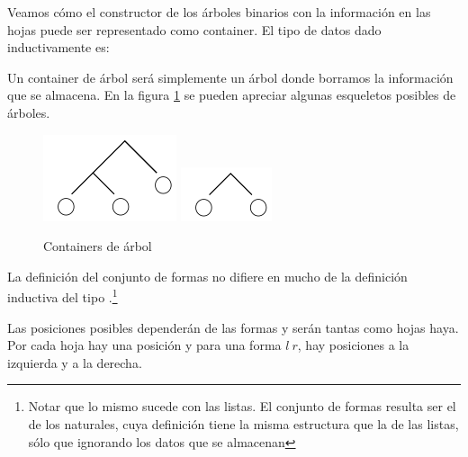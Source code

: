 \begin{example} \label{code:tree} Veamos cómo el constructor de los árboles binarios con la información en las hojas puede ser representado como container. El tipo de datos dado inductivamente es:
  

Un container de árbol será simplemente un árbol donde borramos la información que se almacena.
En la figura \ref{fig:Tree} se pueden apreciar algunas esqueletos posibles de árboles. 

\begin{figure}[H]
\begin{center}
  \includegraphics{img/tree1.pdf}\qquad\qquad
  \quad\qquad
  \includegraphics{img/tree2.pdf}
\end{center}
\caption{Containers de árbol}
\label{fig:Tree}
\end{figure}

La definición del conjunto de formas no difiere en mucho de la definición
inductiva del tipo .\footnote{Notar
  que lo mismo sucede con las listas. El conjunto de formas resulta
  ser el de los naturales, cuya definición tiene la misma estructura
  que la de las listas, sólo que ignorando los datos que se almacenan} 


Las posiciones posibles dependerán de las formas y serán tantas como
hojas haya. Por cada hoja hay una posición y para una forma  $l\ r$, hay posiciones a la izquierda y a la derecha. 



\end{example}

